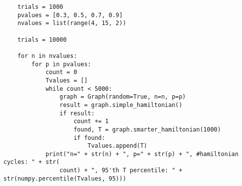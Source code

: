 \documentclass[10pt,a4paper]{report}
\begin{document}
\begin{verbatim}
    trials = 1000
    pvalues = [0.3, 0.5, 0.7, 0.9]
    nvalues = list(range(4, 15, 2))

    trials = 10000

    for n in nvalues:
        for p in pvalues:
            count = 0
            Tvalues = []
            while count < 5000:
                graph = Graph(random=True, n=n, p=p)
                result = graph.simple_hamiltonian()
                if result:
                    count += 1
                    found, T = graph.smarter_hamiltonian(1000)
                    if found:
                        Tvalues.append(T)
            print("n=" + str(n) + ", p=" + str(p) + ", #hamiltonian cycles: " + str(
                count) + ", 95'th T percentile: " + str(numpy.percentile(Tvalues, 95)))
\end{verbatim}
\end{document}
